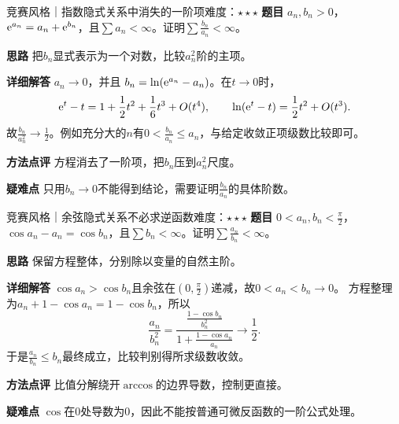 \begin{example}{竞赛风格｜指数隐式关系中消失的一阶项}{难度：$\star\star\star$}\label{cse:ex:exponential}
\textbf{题目} $a_n,b_n>0$，$\mathrm{e}^{a_n}=a_n+\mathrm{e}^{b_n}$，且$\sum a_n<\infty$。证明$\sum \frac{b_n}{a_n}<\infty$。
\par\textbf{思路} 把$b_n$显式表示为一个对数，比较$a_n^2$阶的主项。
\par\textbf{详细解答} $a_n\to0$，并且
$b_n=\ln(\mathrm{e}^{a_n}-a_n)$。在$t\to0$时，
\[
\mathrm{e}^t-t=1+\dfrac12t^2+\dfrac16t^3+O(t^4),\qquad
\ln(\mathrm{e}^t-t)=\dfrac12t^2+O(t^3).
\]
故$\frac{b_n}{a_n^2}\to\frac{1}{2}$。例如充分大的$n$有$0<\frac{b_n}{a_n}\le a_n$，与给定收敛正项级数比较即可。
\par\textbf{方法点评} 方程消去了一阶项，把$b_n$压到$a_n^2$尺度。
\par\textbf{疑难点} 只用$b_n\to0$不能得到结论，需要证明$\frac{b_n}{a_n}$的具体阶数。
\end{example}

\begin{example}{竞赛风格｜余弦隐式关系不必求逆函数}{难度：$\star\star\star$}\label{cse:ex:cosine}
\textbf{题目} $0<a_n,b_n<\frac{\pi}{2}$，$\cos a_n-a_n=\cos b_n$，且$\sum b_n<\infty$。证明$\sum \frac{a_n}{b_n}<\infty$。
\par\textbf{思路} 保留方程整体，分别除以变量的自然主阶。
\par\textbf{详细解答} $\cos a_n>\cos b_n$且余弦在$(0,\frac{\pi}{2})$递减，故$0<a_n<b_n\to0$。
方程整理为$a_n+1-\cos a_n=1-\cos b_n$，所以
\[
\dfrac{a_n}{b_n^2}
=\dfrac{\frac{1-\cos b_n}{b_n^2}}{1+\frac{1-\cos a_n}{a_n}}
\longrightarrow\dfrac12.
\]
于是$\frac{a_n}{b_n}\le b_n$最终成立，比较判别得所求级数收敛。
\par\textbf{方法点评} 比值分解绕开$\arccos$的边界导数，控制更直接。
\par\textbf{疑难点} $\cos$在0处导数为0，因此不能按普通可微反函数的一阶公式处理。
\end{example}

